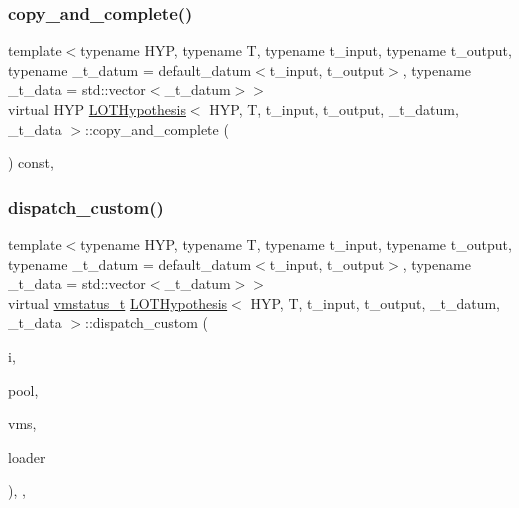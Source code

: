 \subsubsection{\texorpdfstring{copy\+\_\+and\+\_\+complete()}{copy\_and\_complete()}}
{\footnotesize\ttfamily template$<$typename H\+YP, typename T, typename t\+\_\+input, typename t\+\_\+output, typename \+\_\+t\+\_\+datum = default\+\_\+datum$<$t\+\_\+input, t\+\_\+output$>$, typename \+\_\+t\+\_\+data = std\+::vector$<$\+\_\+t\+\_\+datum$>$$>$ \\
virtual H\+YP \hyperlink{class_l_o_t_hypothesis}{L\+O\+T\+Hypothesis}$<$ H\+YP, T, t\+\_\+input, t\+\_\+output, \+\_\+t\+\_\+datum, \+\_\+t\+\_\+data $>$\+::copy\+\_\+and\+\_\+complete (\begin{DoxyParamCaption}{ }\end{DoxyParamCaption}) const\hspace{0.3cm}{\ttfamily [inline]}, {\ttfamily [virtual]}}

\mbox{\label{class_l_o_t_hypothesis_a9aade3ee6939a58e5d5b53505cfb2e7a}} 
\subsubsection{\texorpdfstring{dispatch\+\_\+custom()}{dispatch\_custom()}}
{\footnotesize\ttfamily template$<$typename H\+YP, typename T, typename t\+\_\+input, typename t\+\_\+output, typename \+\_\+t\+\_\+datum = default\+\_\+datum$<$t\+\_\+input, t\+\_\+output$>$, typename \+\_\+t\+\_\+data = std\+::vector$<$\+\_\+t\+\_\+datum$>$$>$ \\
virtual \hyperlink{_instruction_8h_a6202215407ab29590bb936ca2996cf64}{vmstatus\+\_\+t} \hyperlink{class_l_o_t_hypothesis}{L\+O\+T\+Hypothesis}$<$ H\+YP, T, t\+\_\+input, t\+\_\+output, \+\_\+t\+\_\+datum, \+\_\+t\+\_\+data $>$\+::dispatch\+\_\+custom (\begin{DoxyParamCaption}\item[{\hyperlink{class_instruction}{Instruction}}]{i,  }\item[{\hyperlink{class_virtual_machine_pool}{Virtual\+Machine\+Pool}$<$ t\+\_\+input, t\+\_\+output $>$ $\ast$}]{pool,  }\item[{\hyperlink{class_virtual_machine_state}{Virtual\+Machine\+State}$<$ t\+\_\+input, t\+\_\+output $>$ $\ast$}]{vms,  }\item[{\hyperlink{class_dispatchable}{Dispatchable}$<$ t\+\_\+input, t\+\_\+output $>$ $\ast$}]{loader }\end{DoxyParamCaption})\hspace{0.3cm}{\ttfamily [inline]}, {\ttfamily [override]}, {\ttfamily [virtual]}}



